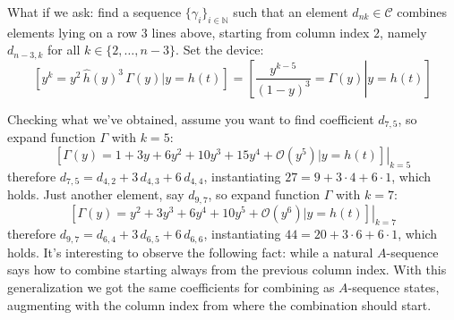 What if we ask: find a sequence $\lbrace \gamma_{i} \rbrace_{i\in\mathbb{N}}$ 
such that an element $d_{nk}\in\mathcal{C}$ combines elements lying on a
row $3$ lines above, starting from column index $2$, 
namely $d_{n-3,k}$ for all $k\in\lbrace 2,\ldots,n-3\rbrace$. 
Set the device:
\begin{displaymath}
    \left[y^{k} = y^{2}\,\hat{h}(y)^3\,\Gamma(y) \big| y = h(t) \right] =
        \left.\left[\frac{y^{k-5}}{(1-y)^3} = \Gamma(y) \right| y = h(t) \right]
\end{displaymath}

Checking what we've obtained, assume you want to find coefficient $d_{7,5}$, 
 so expand function $\Gamma$ with $k=5$:
\begin{displaymath}
    \left.\left[\Gamma(y)=1 + 3y + 6y^2 + 10y^3 + 15y^4 + \mathcal{O}(y^5) 
        \big| y = h(t) \right]\right|_{k=5}
\end{displaymath}
therefore $d_{7,5}=d_{4,2} + 3\,d_{4,3} + 6\,d_{4,4}$, 
instantiating $27 = 9 + 3\cdot4 + 6\cdot1$, which holds.
Just another element, say $d_{9,7}$, so expand function $\Gamma$ with $k=7$:
\begin{displaymath}
    \left.\left[\Gamma(y)=y^2 + 3y^3 + 6y^4 + 10y^5 +  \mathcal{O}(y^6) 
        \big| y = h(t) \right]\right|_{k=7}
\end{displaymath}
therefore $d_{9,7}=d_{6,4} + 3\,d_{6,5} + 6\,d_{6,6}$, 
instantiating $44 = 20 + 3\cdot6 + 6\cdot1$, which holds.
It's interesting to observe the following fact: while a natural $A$-sequence
says how to combine starting always from the previous column index. With
this generalization we got the same coefficients for combining as $A$-sequence
states, augmenting with the column index from where the combination should start.

